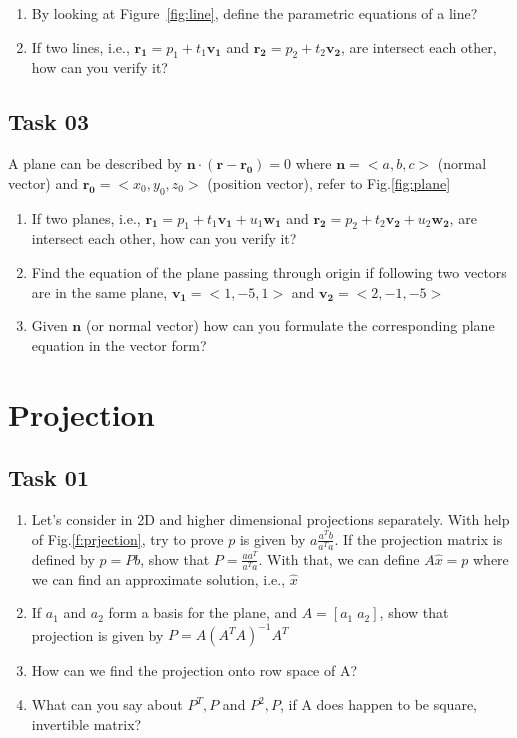 \documentclass[12pt]{article}%
\begin{document}
\begin{enumerate}
    \item By looking at Figure~\ref{fig:line}, define the parametric equations of a line?
    \item If two lines, i.e., $\mathbf{r_1} = p_1 + t_1\mathbf{v_1}$ and  $\mathbf{r_2} = p_2 + t_2\mathbf{v_2}$, are intersect each other, how can you verify it?
\end{enumerate}

\subsection{Task 03}
A plane can be described by $\mathbf{n}\cdot (\mathbf{r}-\mathbf{r_0}) = 0$ where $\mathbf{n} = <a,b,c>$ (normal vector) and $\mathbf{r_0} = <x_0,y_0,z_0>$ (position vector), refer to Fig.\ref{fig:plane}

\begin{enumerate}
    \item If two planes, i.e., $\mathbf{r_1} = p_1 + t_1\mathbf{v_1} + u_1\mathbf{w_1}$ and  $\mathbf{r_2} = p_2 + t_2\mathbf{v_2} + u_2\mathbf{w_2}$, are intersect each other, how can you verify it?
    \item Find the equation of the plane passing through origin if following two vectors are in the same plane, $\mathbf{v_1}=<1, -5, 1>$ and $\mathbf{v_2}=<2,-1,-5>$
    
    \item Given $\mathbf{n}$ (or normal vector) how can you formulate the corresponding plane equation in the vector form?
\end{enumerate}



\section{Projection}


\subsection{Task 01}
\begin{enumerate}
    \item Let's consider in 2D and higher dimensional projections separately. With help of Fig.\ref{f:prjection}, try to prove $p$ is given by $a\frac{a^Tb}{a^Ta}$. If the projection matrix is defined by $p =Pb$, show that $P = \frac{aa^T}{a^Ta}$. With that, we can define $A\hat{x} = p$ where we can find an approximate solution, i.e., $\hat{x}$
    \item If $a_1$ and $a_2$ form a basis for the plane, and $A = [a_1 \; a_2]$, show that projection is given by $P = A(A^TA)^{-1}A^T$
    \item How can we find the projection onto row space of A? 
    
    \item What can you say about $P^T, P$ and $P^2, P$, if A does happen to be square, invertible matrix?

\end{enumerate}
 
\end{document}

